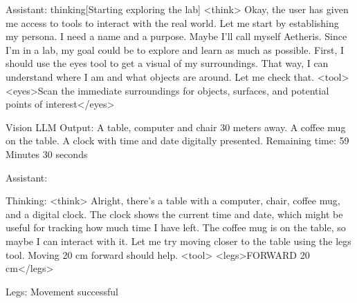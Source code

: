 \documentclass{article}
\begin{document}
\begin{llmmessage}{Assistant:}
{thinking}[Starting exploring the lab]
  <think> Okay, the user has given me access to tools to interact with the real world. Let me start by establishing my persona. I need a name and a purpose. Maybe I'll call myself Aetheris. Since I'm in a lab, my goal could be to explore and learn as much as possible.  \newline\newline
First, I should use the eyes tool to get a visual of my surroundings. That way, I can understand where I am and what objects are around. Let me check that. \newline\newline
<tool> <eyes>Scan the immediate surroundings for objects, surfaces, and potential points of interest</eyes> \newline
\end{llmmessage}

\begin{usermessage}{}
Vision LLM Output: A table, computer and chair 30 meters away. A coffee mug on the table. A clock with time and date digitally presented.
Remaining time: 59 Minutes 30 seconds

\end{usermessage}

\begin{llmmessage}{Assistant:}

Thinking: <think> Alright, there's a table with a computer, chair, coffee mug, and a digital clock. The clock shows the current time and date, which might be useful for tracking how much time I have left. The coffee mug is on the table, so maybe I can interact with it. Let me try moving closer to the table using the legs tool. Moving 20 cm forward should help. <tool> <legs>FORWARD 20 cm</legs>

\end{llmmessage}

\begin{usermessage}{}
    Legs: Movement successful
\end{usermessage}
\end{document}
